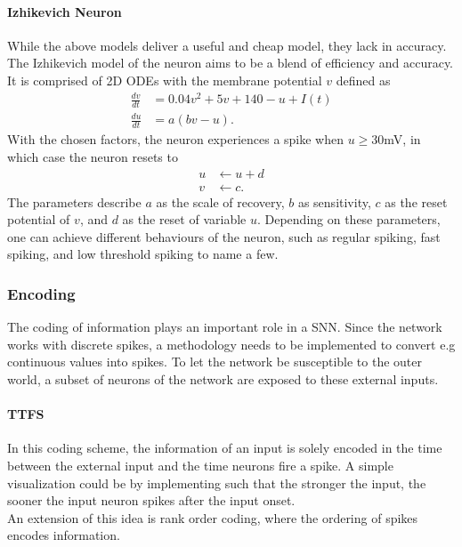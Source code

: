 	\paragraph{Izhikevich Neuron}
	While the above models deliver a useful and cheap model, they lack in accuracy. The Izhikevich model \cite{izhikevich_simple_2003} of the neuron aims to be a blend of efficiency and accuracy. It is comprised of 2D ODEs with the membrane potential $v$ defined as
	\begin{equation}
	\begin{aligned}
	\frac{d v}{dt} &= 0.04v^2 + 5v + 140 -u +I(t)\\
	\frac{d u}{dt} &= a(bv-u).
	\end{aligned}
	\end{equation}
	With the chosen factors, the neuron experiences a spike when $u\geq30 $mV, in which case the neuron resets to
	\begin{equation}
	\begin{aligned}
	u &\leftarrow u+d\\
	v&\leftarrow c.
	\end{aligned}
	\end{equation}
	The parameters describe $a$ as the scale of recovery, $b$ as sensitivity, $c$ as the reset potential of $v$, and $d$ as the reset of variable $u$. Depending on these parameters, one can achieve different behaviours of the neuron, such as regular spiking, fast spiking, and low threshold spiking to name a few.

\subsubsection{Encoding}
	The coding of information plays an important role in a \ac{SNN}. Since the network works with discrete spikes, a methodology needs to be implemented to convert e.g continuous values into spikes. To let the network be susceptible to the outer world, a subset of neurons of the network are exposed to these external inputs.
	\paragraph{\ac{TTFS}}
	In this coding scheme, the information of an input is solely encoded in the time between the external input and the time neurons fire a spike. A simple visualization could be by implementing such that the stronger the input, the sooner the input neuron spikes after the input onset.\\
	An extension of this idea is rank order coding, where the ordering of spikes encodes information\cite{thorpe_spike-based_2001}.\\
